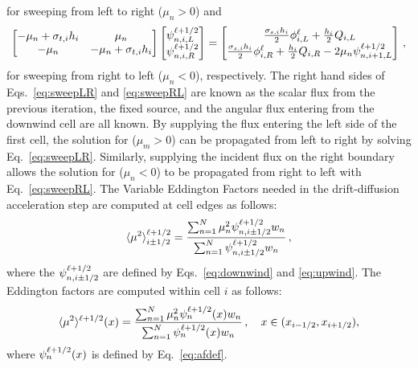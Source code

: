 for sweeping from left to right ($\mu_n > 0$) and 
	\begin{equation} \label{eq:sweepRL}
		\left[\begin{matrix} 
			-\mu_n + \sigma_{t,i}h_i & \mu_n \\ 
			-\mu_n & -\mu_n + \sigma_{t,i}h_i \\ 
		\end{matrix} \right]
		\left[\begin{matrix}
			\psi_{n,i,L}^{\ell+1/2} \\ \psi_{n,i,R}^{\ell+1/2}
		\end{matrix} \right]
		= \left[\begin{matrix}
			\frac{\sigma_{s,i}h_i}{2} \phi_{i,L}^\ell + \frac{h_i}{2} Q_{i,L} \\ 
			\frac{\sigma_{s,i}h_i}{2} \phi_{i,R}^\ell + \frac{h_i}{2} Q_{i,R} - 2\mu_n \psi_{n,i+1,L}^{\ell+1/2}
		\end{matrix} \right]
		\,, 
	\end{equation}
for sweeping from right to left ($\mu_n < 0$), respectively. The right hand sides of Eqs.~\ref{eq:sweepLR} and \ref{eq:sweepRL} are known 
as the scalar flux from the previous iteration, the fixed source, and the angular flux entering from the downwind cell are all known. By supplying the flux entering the left side of the first cell, the solution for ($\mu_m > 0$) can be propagated from left to right by solving Eq.~\ref{eq:sweepLR}. Similarly, supplying the incident flux on the right boundary allows the solution for ($\mu_n < 0$) to be propagated from right to left with Eq.~\ref{eq:sweepRL}. The Variable Eddington Factors needed in the drift-diffusion acceleration step are computed at cell edges as follows: 
	\begin{equation} \label{lldg:edde}
		\langle \mu^2 \rangle^{\ell+1/2}_{i\pm 1/2} = \frac{
			\sum_{n=1}^N \mu_n^2 \psi_{n,i\pm 1/2}^{\ell+1/2} w_n
		}{
			\sum_{n=1}^N \psi_{n,i\pm 1/2}^{\ell+1/2} w_n 
		} \,,
	\end{equation}
where the $\psi_{n,i\pm1/2}^{\ell+1/2}$ are defined by Eqs.~\ref{eq:downwind} and \ref{eq:upwind}. The Eddington factors are 
computed within cell $i$ as follows:
\begin{equation} \label{lldg:eddi}
		\langle \mu^2 \rangle^{\ell+1/2}(x) = \frac{
			\sum_{n=1}^N \mu_n^2 \psi_{n}^{\ell+1/2}(x) w_n
		}{
			\sum_{n=1}^N \psi_{n}^{\ell+1/2}(x) w_n 
		} \,, \quad x\in(x_{i-1/2},x_{i+1/2}),
	\end{equation}
where $\psi_{n}^{\ell+1/2}(x)$ is defined by Eq.~\ref{eq:afdef}.
